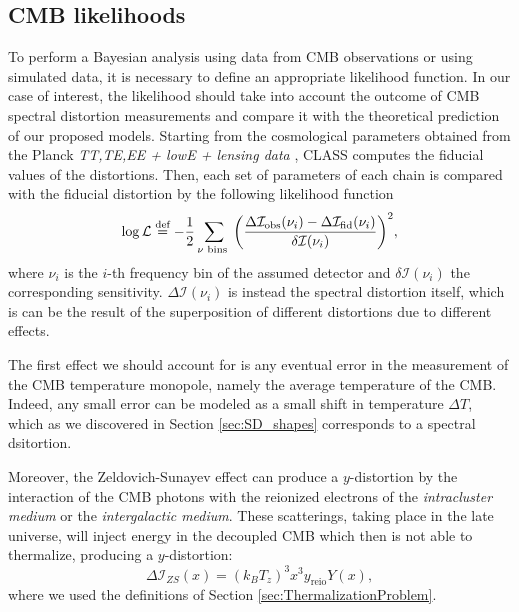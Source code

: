 \subsection{CMB likelihoods}
To perform a Bayesian analysis using data from CMB observations or using simulated data, it is necessary to define an appropriate likelihood function. In our case of interest, the likelihood should take into account the outcome of CMB spectral distortion measurements and compare it with the theoretical prediction of our proposed models. Starting from the cosmological parameters obtained from the Planck \emph{TT,TE,EE + lowE + lensing data} \cite{planck2018results}, CLASS computes the fiducial values of the distortions. Then, each set of parameters of each chain is compared with the fiducial distortion by the following likelihood function
\begin{equation}
    \log \mathcal L\stackrel{\text{def}}{=} -\frac12 \sum_{\nu \text{ bins }}\bigg(\frac{\Delta\mathcal I_\text{obs}(\nu_i)-\Delta\mathcal I_\text{fid}(\nu_i)}{\delta \mathcal I(\nu_i)}\bigg)^2,
\end{equation}
where $\nu_i$ is the $i$-th frequency bin of the assumed detector and $\delta \mathcal I(\nu_i)$ the corresponding sensitivity. $\Delta \mathcal I(\nu_i)$ is instead the spectral distortion itself, which is can be the result of the superposition of different distortions due to different effects. 

The first effect we should account for is any eventual error in the measurement of the CMB temperature monopole, namely the average temperature of the CMB. Indeed, any small error can be modeled as a small shift in temperature $\Delta T$, which as we discovered in Section \ref{sec:SD_shapes} corresponds to a spectral dsitortion.

Moreover, the Zeldovich-Sunayev effect \cite{Zeldovich1972} can produce a $y$-distortion by the interaction of the CMB photons with the reionized electrons of the \emph{intracluster medium} or the \emph{intergalactic medium}. These scatterings, taking place in the late universe, will inject energy in the decoupled CMB which then is not able to thermalize, producing a $y$-distortion:
$$ \Delta \mathcal I_{ZS}(x)=(k_BT_z)^3x^3 y_\text{reio} Y(x),$$
where we used the definitions of Section \ref{sec:ThermalizationProblem}.

